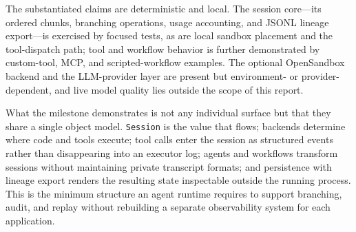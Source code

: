 The substantiated claims are deterministic and local. The session core---its
ordered chunks, branching operations, usage accounting, and JSONL lineage
export---is exercised by focused tests, as are local sandbox placement and the
tool-dispatch path; tool and workflow behavior is further demonstrated by
custom-tool, MCP, and scripted-workflow examples. The optional OpenSandbox
backend and the LLM-provider layer are present but environment- or
provider-dependent, and live model quality lies outside the scope of this report.

What the milestone demonstrates is not any individual surface but that they
share a single object model. \texttt{Session} is the value that flows; backends
determine where code and tools execute; tool calls enter the session as
structured events rather than disappearing into an executor log; agents and
workflows transform sessions without maintaining private transcript formats; and
persistence with lineage export renders the resulting state inspectable outside
the running process. This is the minimum structure an agent runtime requires to
support branching, audit, and replay without rebuilding a separate observability
system for each application.

